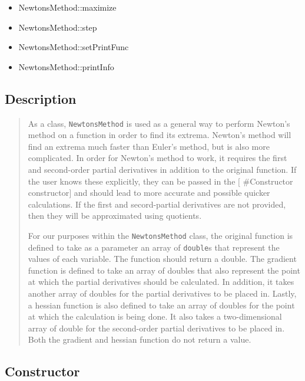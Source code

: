 \begin{itemize}
\item NewtonsMethod::maximize

\item NewtonsMethod::step

\item NewtonsMethod::setPrintFunc

\item NewtonsMethod::printInfo
\end{itemize}

\subsection*{Description}

\begin{quotation}
As a class, \texttt{NewtonsMethod} is used as a general way to perform
Newton's method on a function in order to find its extrema. Newton's method
will find an extrema much faster than Euler's method, but is also more
complicated. In order for Newton's method to work, it requires the first and
second-order partial derivatives in addition to the original function. If
the user knows these explicitly, they can be passed in the \mbox{$[$}%
\#Constructor constructor\mbox{$]$} and should lead to more accurate and
possible quicker calculations. If the first and secord-partial derivatives
are not provided, then they will be approximated using quotients.

For our purposes within the \texttt{NewtonsMethod} class, the original
function is defined to take as a parameter an array of \texttt{double}s that
represent the values of each variable. The function should return a double.
The gradient function is defined to take an array of doubles that also
represent the point at which the partial derivatives should be calculated.
In addition, it takes another array of doubles for the partial derivatives
to be placed in. Lastly, a hessian function is also defined to take an array
of doubles for the point at which the calculation is being done. It also
takes a two-dimensional array of double for the second-order partial
derivatives to be placed in. Both the gradient and hessian function do not
return a value.
\end{quotation}

\subsection*{Constructor}

